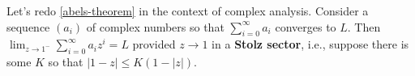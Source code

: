 \documentclass{homework}
\begin{document}
                                                                 \begin{problem}
                                                                   Let's redo \ref{abels-theorem} in the context of complex analysis.
                                                                     Consider a sequence $(a_i)$ of complex numbers so that
                                                                       $\sum_{i=0}^\infty a_i$ converges to $L$.  Then
                                                                         $\lim_{z \to 1^{-}} \sum_{i=0}^\infty a_i z^i = L$ provided
                                                                           $z \to 1$ in a \textbf{Stolz sector}, i.e., suppose there is some
                                                                             $K$ so that $|1-z| \leq K(1-|z|)$.
                                                                             \end{problem}
\end{document}
